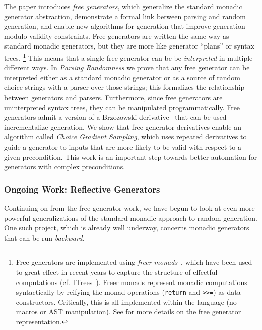 The paper introduces {\em free generators}, which generalize the standard
monadic generator abstraction, demonstrate a formal link between parsing and
random generation, and enable new algorithms for generation that improve
generation modulo validity constraints. Free generators are written the same
way as standard monadic generators, but they are more like generator ``plans''
or syntax trees.%
\footnote{Free generators are implemented using {\em freer
monads}~\cite{kiselyov2015freer}, which have been used to great effect in recent
years to capture the structure of effectful computations
(cf.~ITrees~\cite{old:xia2019interaction}). Freer monads represent
monadic computations syntactically by reifying the monad operations
(\lstinline{return} and \lstinline{>>=}) as data constructors. Critically, this
is all implemented within the language (no macros or AST
manipulation). See \cite{goldstein2022parsing} for more details on the
free generator representation.}
This means that a single free generator can be be {\em interpreted} in multiple
different ways. In {\em Parsing Randomness} we prove that any free generator can
be interpreted either as a standard monadic generator or as a source of
random choice strings with a parser over those strings; this formalizes the
relationship between generators and parsers. Furthermore, since free generators
are uninterpreted syntax trees, they can be manipulated programmatically. Free
generators admit a version of a Brzozowski
derivative~\cite{brzozowski1964derivatives} that can be used incrementalize
generation. We show that free generator derivatives enable an algorithm called
{\em Choice Gradient Sampling}, which uses repeated derivatives to guide a
generator to inputs that are more likely to be valid with respect to a given
precondition. This work is an important step towards better automation for
generators with complex preconditions.

\subsubsection{Ongoing Work: Reflective Generators}
Continuing on from the free generator work, we have begun to look at even more
powerful generalizations of the standard monadic approach to random generation.
One such project, which is already well underway, concerns monadic generators
that can be run {\em backward}.

